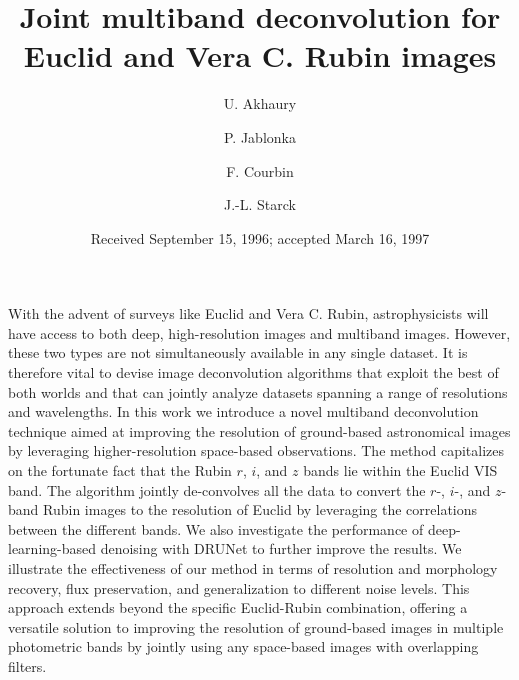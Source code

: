 \documentclass[traditabstract]{aa}
\begin{document}
 

   \title{Joint multiband deconvolution for Euclid and Vera C. Rubin images}

   \author{U. Akhaury
          \and 
          P. Jablonka
          \and
          F. Courbin
          \and
          J.-L. Starck
          }

   \date{Received September 15, 1996; accepted March 16, 1997}

 
  \abstract
    {With the advent of surveys like Euclid and Vera C. Rubin, astrophysicists will have access to both deep, high-resolution images and multiband images. However, these two types are not simultaneously available in any single dataset. It is therefore vital to devise image deconvolution algorithms that exploit the best of both worlds and that can jointly analyze datasets spanning a range of resolutions and wavelengths. In this work we introduce a novel multiband deconvolution technique aimed at improving the resolution of ground-based astronomical images by leveraging higher-resolution space-based observations. The method capitalizes on the fortunate fact that the Rubin $r$, $i$, and $z$ bands lie within the Euclid VIS band. The algorithm jointly de-convolves all the data to convert the $r$-, $i$-, and $z$-band Rubin images to the resolution of Euclid by leveraging the correlations between the different bands. We also investigate the performance of deep-learning-based denoising with DRUNet to further improve the results. We illustrate the effectiveness of our method in terms of resolution and morphology recovery, flux preservation, and generalization to different noise levels. This approach extends beyond the specific Euclid-Rubin combination, offering a versatile solution to improving the resolution of ground-based images in multiple photometric bands by jointly using any space-based images with overlapping filters.}
\end{document}
